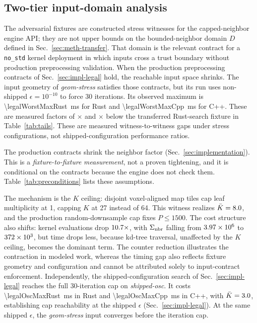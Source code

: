 


\subsection{Two-tier input-domain analysis}
\label{sec:eval-twotier}
The adversarial fixtures are constructed stress witnesses for the capped-neighbor engine
API; they are not upper bounds on the bounded-neighbor domain $D$ defined in
Sec.~\ref{sec:meth-transfer}. That domain is the
relevant contract for a \texttt{no\_std} kernel deployment in which inputs cross a trust
boundary without production preprocessing validation. When the production
preprocessing contracts of Sec.~\ref{sec:impl-legal} hold, the reachable input space
shrinks. The input geometry of \emph{geom-stress} satisfies those contracts, but its run
uses non-shipped $\epsilon=10^{-10}$ to force 30 iterations. Its observed maximum is
\SI{\legalWorstMaxRust}{ms} for Rust and \SI{\legalWorstMaxCpp}{ms} for C++. These are
measured factors of \legalWorstRatioRust$\times$ and \legalWorstRatioCpp$\times$ below
the transferred Rust-search fixture in Table~\ref{tab:tails}. These are measured
witness-to-witness gaps under stress configurations, not shipped-configuration performance
ratios.

The production contracts shrink the neighbor factor (Sec.~\ref{sec:implementation}). This
is a \emph{fixture-to-fixture measurement}, not a proven tightening, and it is conditional
on the contracts because the engine does not check them. Table~\ref{tab:preconditions}
lists these assumptions.

The mechanism is the $K$ ceiling: disjoint voxel-aligned map tiles cap leaf multiplicity at
1, capping $K$ at 27 instead of 64. This witness realizes
$\bar{K} = 8.0$, and the production random-downsample cap fixes
$P \le 1500$. The cost structure also shifts: kernel evaluations drop
$10.7\times$, with $\Sigma_{\mathrm{nbr}}$ falling
from $3.97\times10^6$ to $372\times10^3$, but time
drops less, because kd-tree traversal, unaffected by the $K$ ceiling, becomes the dominant
term. The counter reduction illustrates the contraction in modeled work, whereas the timing
gap also reflects fixture geometry and configuration and cannot be attributed solely to
input-contract enforcement. Independently, the shipped-configuration search of
Sec.~\ref{sec:impl-legal} reaches the full 30-iteration cap on \emph{shipped-osc}. It costs
\SI{\legalOscMaxRust}{ms} in Rust and \SI{\legalOscMaxCpp}{ms} in C++, with
$\bar{K} = 3.0$, establishing cap reachability at the shipped $\epsilon$
(Sec.~\ref{sec:impl-legal}). At the same shipped $\epsilon$, the
\emph{geom-stress} input converges before the iteration cap.

